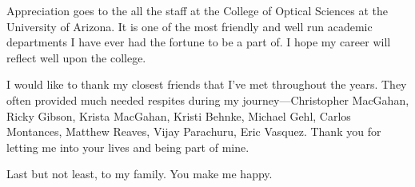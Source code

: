 Appreciation goes to the all the staff at the College of Optical Sciences at the University of Arizona. It is one of the most friendly and well run academic departments I have ever had the fortune to be a part of. I hope my career will reflect well upon the college. 

I would like to thank my closest friends that I've met throughout the years. They often provided much needed respites during my journey---Christopher MacGahan, Ricky Gibson, Krista MacGahan, Kristi Behnke, Michael Gehl, Carlos Montances, Matthew Reaves, Vijay Parachuru, Eric Vasquez. Thank you for letting me into your lives and being part of mine.

Last but not least, to my family. You make me happy. 